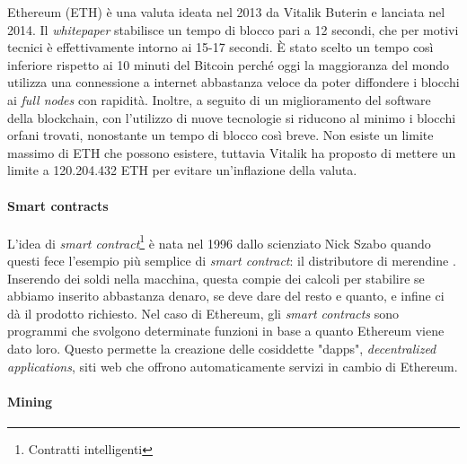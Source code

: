 \documentclass {article}
\begin{document}
Ethereum (ETH) è una valuta ideata nel 2013 da Vitalik Buterin e lanciata nel 2014. %
Il \textit{whitepaper} stabilisce un tempo di blocco pari a 12 secondi, che per motivi tecnici è effettivamente intorno ai 15-17 secondi. %
È stato scelto un tempo così inferiore rispetto ai 10 minuti del Bitcoin perché oggi la maggioranza del mondo utilizza una connessione a internet abbastanza veloce da poter diffondere i blocchi ai \textit{full nodes} con rapidità.
Inoltre, a seguito di un miglioramento del software della blockchain, con l'utilizzo di nuove tecnologie si riducono al minimo i blocchi orfani trovati, nonostante un tempo di blocco così breve.
Non esiste un limite massimo di ETH che possono esistere, tuttavia Vitalik ha proposto di mettere un limite a 120.204.432 ETH per evitare un'inflazione della valuta.

\paragraph {Smart contracts}

L'idea di \textit{smart contract}\footnote{Contratti intelligenti} è nata nel 1996 dallo scienziato Nick Szabo quando questi fece l'esempio più semplice di \textit{smart contract}: il distributore di merendine \cite{nickszabo}.
Inserendo dei soldi nella macchina, questa compie dei calcoli per stabilire se abbiamo inserito abbastanza denaro, se deve dare del resto e quanto, e infine ci dà il prodotto richiesto.
Nel caso di Ethereum, gli \textit{smart contracts} sono programmi che svolgono determinate funzioni in base a quanto Ethereum viene dato loro.
Questo permette la creazione delle cosiddette "dapps", \textit{decentralized applications}, siti web che offrono automaticamente servizi in cambio di Ethereum.

\paragraph {Mining}
\end{document}
